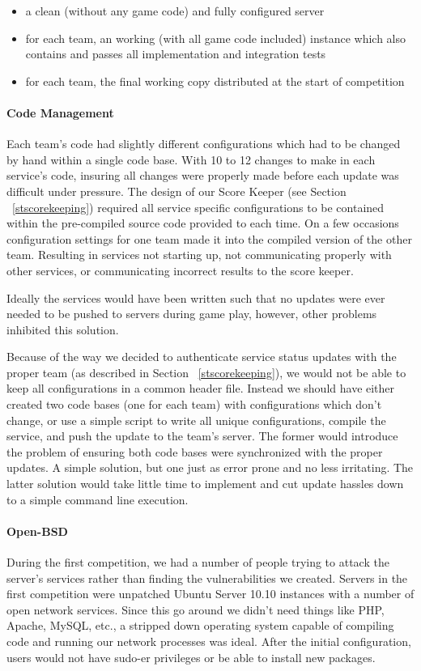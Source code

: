 \documentclass[10pt]{article}
\begin{document}
\begin{itemize}
  \item a clean (without any game code) and fully configured server
  \item for each team, an working (with all game code included) instance which
  also contains and passes all implementation and integration tests
  \item for each team, the final working copy distributed at the start of
  competition
\end{itemize}

\paragraph*{Code Management} Each team's code had slightly different
configurations which had to be changed by hand within a single code base. With
10 to 12 changes to make in each service's code, insuring all changes were
properly made before each update was difficult under pressure. The design of
our Score Keeper (see Section ~\ref{stscorekeeping}) required all service
specific configurations to be contained within the pre-compiled source code
provided to each time. On a few occasions configuration settings for one team
made it into the compiled version of the other team. Resulting in services not
starting up, not communicating properly with other services, or communicating
incorrect results to the score keeper.

Ideally the services would have been written such that no updates were ever
needed to be pushed to servers during game play, however, other problems
inhibited this solution. 

Because of the way we decided to authenticate service status updates with
the proper team (as described in Section ~\ref{stscorekeeping}), we would
not be able to keep all configurations in a common header file. Instead we
should have either created two code bases (one for each team) with
configurations which don't change, or use a simple script to write all unique
configurations, compile the service, and push the update to the team's server.
The former would introduce the problem of ensuring both code bases were
synchronized with the proper updates. A simple solution, but one just as error
prone and no less irritating. The latter solution would take little time to
implement and cut update hassles down to a simple command line execution.

\paragraph*{Open-BSD} During the first competition, we had a
number of people trying to attack the server's services rather than finding the vulnerabilities
we created. Servers in the first competition were unpatched Ubuntu Server 10.10
instances with a number of open network services. Since this go around we didn't
need things like PHP, Apache, MySQL, etc., a stripped down operating system
capable of compiling code and running our network processes was ideal. After the
initial configuration, users would not have sudo-er privileges or be able to
install new packages. 
\end{document}
